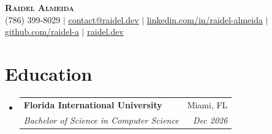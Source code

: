 \documentclass[letterpaper,11pt]{article}
\makeatletter
\newcommand{\resumeItem}[1]{
  \item\small{
    {#1 \vspace{-2pt}}
  }
}
\newcommand{\resumeSubheading}[4]{
  \vspace{-2pt}\item
    \begin{tabular*}{0.97\textwidth}[t]{l@{\extracolsep{\fill}}r}
      \textbf{#1} & #2 \\
      \textit{\small#3} & \textit{\small #4} \\
    \end{tabular*}\vspace{-7pt}
}
\newcommand{\resumeSubHeadingListStart}{\begin{itemize}[leftmargin=0.15in, label={}]}
\newcommand{\resumeSubHeadingListEnd}{\end{itemize}}
\newcommand{\plus}{{\raisebox{0.25ex}{+}}}
\makeatother
\begin{document}
\begin{center}
    \textbf{\Huge \scshape Raidel Almeida} \\ \vspace{2pt}
    \small (786) 399-8029 $|$ 
    \href{mailto:contact@raidel.dev}
    {\uline{contact@raidel.dev}} $|$  
    \href{https://linkedin.com/in/raidel-almeida}{\uline{linkedin.com/in/raidel-almeida}} $|$
    \href{https://github.com/raidel-a}{\uline{github.com/raidel-a}} $|$
    \href{https://raidel.dev/}
    {\uline{raidel.dev}}
\end{center}


\section{Education}
  \resumeSubHeadingListStart
    \resumeSubheading
      {Florida International University}{Miami, FL}
      {Bachelor of Science in Computer Science}{Dec 2026}
      \vspace{0pt}
  \resumeSubHeadingListEnd

  
\end{document}

